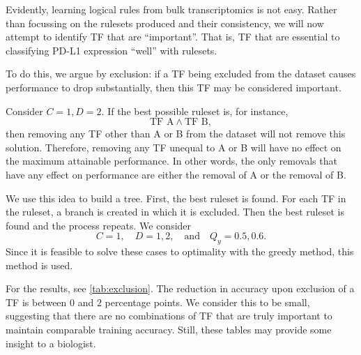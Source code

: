 Evidently, learning logical rules from bulk transcriptomics is not easy.
Rather than focussing on the rulesets produced and their consistency,
we will now attempt to identify TF that are ``important''.
That is, TF that are essential to classifying PD-L1 expression ``well'' with rulesets.

To do this, we argue by exclusion: if a TF being excluded from the dataset causes performance to drop substantially,
then this TF may be considered important.

Consider $C=1, D=2$.
If the best possible ruleset is, for instance,
\[
    \text{TF A} \wedge \text{TF B},
\]
then removing any TF other than A or B from the dataset will not remove this solution.
Therefore, removing any TF unequal to A or B will have no effect on the maximum attainable performance.
In other words, the only removals that have any effect on performance are either the removal of A or the removal of B\@.

We use this idea to build a tree.
First, the best ruleset is found.
For each TF in the ruleset, a branch is created in which it is excluded.
Then the best ruleset is found and the process repeats.
We consider
\[
    C=1, \quad D=1,2, \quad \text{and} \quad Q_y=0.5,0.6.
\]
Since it is feasible to solve these cases to optimality with the greedy method, this method is used.

For the results, see \autoref{tab:exclusion}.
The reduction in accuracy upon exclusion of a TF is between $0$ and $2$ percentage points.
We consider this to be small,
suggesting that there are no combinations of TF that are truly important to maintain comparable training accuracy.
Still, these tables may provide some insight to a biologist.

\clearpage

